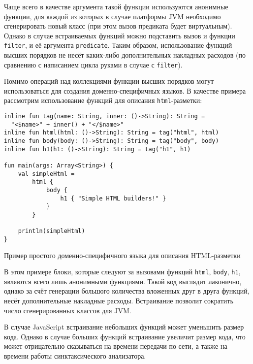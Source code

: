 Чаще всего в качестве аргумента такой функции используются анонимные
функции, для каждой из которых в случае платформы JVM необходимо
сгенерировать новый класс (при этом вызов предиката будет виртуальным).
Однако в случае встраиваемых функций можно подставить вызов
и функции \texttt{filter}, и её аргумента \texttt{predicate}.
Таким образом, использование функций высших порядков не
несёт каких-либо дополнительных накладных расходов (по сравнению
с написанием цикла руками в случае с \texttt{filter}).

Помимо операций над коллекциями функции высших порядков
могут использоваться для создания доменно-специфичных
языков. В качестве примера рассмотрим использование
функций для описания \texttt{html}-разметки:
\begin{listing}[H]
\begin{verbatim}
inline fun tag(name: String, inner: ()->String): String =
  "<$name>" + inner() + "</$name>"
inline fun html(html: ()->String): String = tag("html", html)
inline fun body(body: ()->String): String = tag("body", body)
inline fun h1(h1: ()->String): String = tag("h1", h1)

fun main(args: Array<String>) {
    val simpleHtml =
        html {
            body {
                h1 { "Simple HTML builders!" }
            }
        }

    println(simpleHtml)
}
\end{verbatim}
\caption{Пример простого доменно-специфичного языка для описания HTML-разметки}
\end{listing}

В этом примере блоки, которые следуют за вызовами функций
\texttt{html}, \texttt{body}, \texttt{h1},
являются всего лишь анонимными функциями.
Такой код выглядит лаконично, однако за счёт генерации большого
количества вложенных друг в друга функций, несёт дополнительные
накладные расходы. Встраивание позволит сократить
число сгенерированных классов для JVM.

В случае JavaScript встраивание небольших функций может
уменьшить размер кода. Однако в случае больших функций
встраивание увеличит размер кода, что может
отрицательно сказываться на времени передачи по сети, а также
на времени работы синктаксического анализатора.

